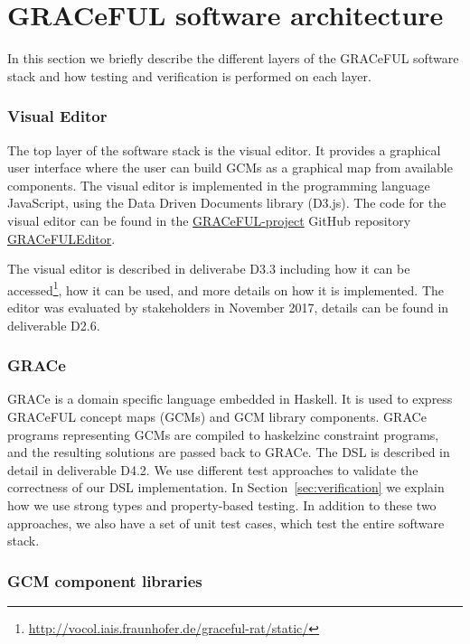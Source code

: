 \documentclass{article}
\begin{document}
\section{GRACeFUL software architecture}
\label{sec:architecture}
In this section we briefly describe the different layers of
the GRACeFUL software stack and how testing and
verification is performed on each layer.

\subsubsection*{Visual Editor}

The top layer of the software stack is the visual editor.
%
It provides a graphical user interface where the user can build GCMs
as a graphical map from available components.
%
The visual editor is implemented in the programming language
JavaScript, using the Data Driven Documents library (D3.js).
%
The code for the visual editor can be found in the
\href{https://github.com/GRACeFUL-project}{GRACeFUL-project} GitHub
repository
\href{https://github.com/GRACeFUL-project/GRACeFULEditor}{GRACeFULEditor}.

The visual editor is described in deliverabe D3.3 including how it can be
accessed\footnote{\url{http://vocol.iais.fraunhofer.de/graceful-rat/static/}},
how it can be used, and more details on how it is implemented.
%
The editor was evaluated by stakeholders in November 2017, details can
be found in deliverable D2.6.

\subsubsection*{GRACe}

GRACe is a domain specific language embedded in Haskell. It is used to express
GRACeFUL concept maps (GCMs) and GCM library components. GRACe programs
representing GCMs are compiled to haskelzinc constraint programs, and the
resulting solutions are passed back to GRACe. The DSL is described in detail in
deliverable D4.2. We use different test approaches to validate the correctness
of our DSL implementation. In Section~\ref{sec:verification} we explain how we
use strong types and property-based testing. In addition to these two approaches,
we also have a set of unit test cases, which test the entire software stack.

\subsubsection*{GCM component libraries}
\end{document}
